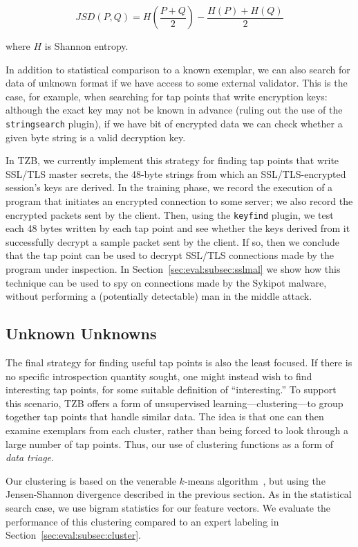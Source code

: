 \[
JSD(P, Q) = H \left ( \frac{P+Q}{2} \right ) - \frac{H(P)+H(Q)}{2}
\]

\noindent where $H$ is Shannon entropy.

In addition to statistical comparison to a known exemplar, we can also
search for data of unknown format if we have access to some external
validator. This is the case, for example, when searching for tap points
that write encryption keys: although the exact key may not be known in
advance (ruling out the use of the \texttt{stringsearch} plugin), if we
have bit of encrypted data we can check whether a given byte string is a
valid decryption key.

In TZB, we currently implement this strategy for finding tap points that
write SSL/TLS master secrets, the 48-byte strings from which an
SSL/TLS-encrypted session's keys are derived. In the training phase, we
record the execution of a program that initiates an encrypted connection
to some server; we also record the encrypted packets sent by the client.
Then, using the \texttt{keyfind} plugin, we test each 48 bytes written
by each tap point and see whether the keys derived from it successfully
decrypt a sample packet sent by the client. If so, then we conclude that
the tap point can be used to decrypt SSL/TLS connections made by the
program under inspection. In Section~\ref{sec:eval:subsec:sslmal} we show
how this technique can be used to spy on connections made by the Sykipot
malware, without performing a (potentially detectable) man in the middle
attack.

\subsection{Unknown Unknowns}

The final strategy for finding useful tap points is also the least
focused. If there is no specific introspection quantity sought, one
might instead wish to find interesting tap points, for some suitable
definition of ``interesting.'' To support this scenario, TZB offers a
form of unsupervised learning---clustering---to group together tap
points that handle similar data. The idea is that one can then examine
exemplars from each cluster, rather than being forced to look through a
large number of tap points. Thus, our use of clustering functions as a
form of \emph{data triage}.

Our clustering is based on the venerable $k$-means
algorithm~\cite{Steinhaus:1956kx}, but using the Jensen-Shannon
divergence described in the previous section. As in the statistical
search case, we use bigram statistics for our feature vectors. We
evaluate the performance of this clustering compared to an expert
labeling in Section~\ref{sec:eval:subsec:cluster}.
